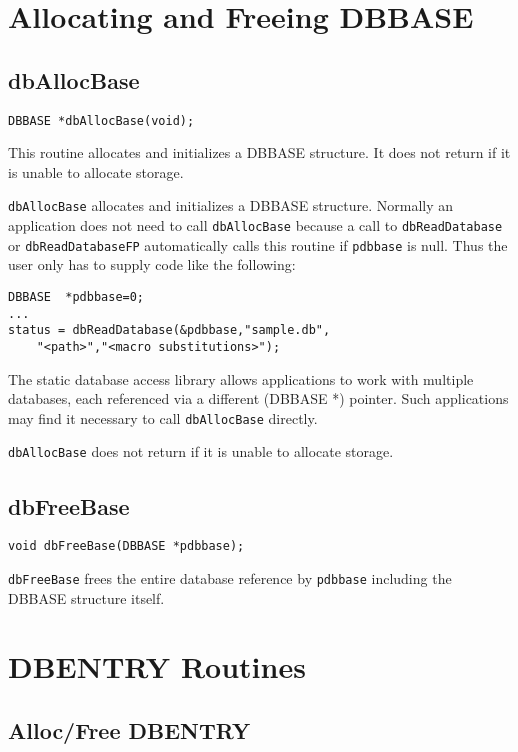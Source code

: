 \section{Allocating and Freeing DBBASE}

\subsection{dbAllocBase}

\begin{verbatim}DBBASE *dbAllocBase(void);
\end{verbatim}This routine allocates and initializes a DBBASE structure. It does not return if it is unable to allocate storage.

\verb|dbAllocBase| allocates and initializes a DBBASE structure. Normally an application does not need to call 
\verb|dbAllocBase| because a call to \verb|dbReadDatabase| or \verb|dbReadDatabaseFP| automatically calls this routine if 
\verb|pdbbase| is null. Thus the user only has to supply code like the following:

\begin{verbatim}DBBASE  *pdbbase=0;
...
status = dbReadDatabase(&pdbbase,"sample.db",
    "<path>","<macro substitutions>");
\end{verbatim}The static database access library allows applications to work with multiple databases, each referenced via a different 
(DBBASE *) pointer. Such applications may find it necessary to call \verb|dbAllocBase| directly.

\verb|dbAllocBase| does not return if it is unable to allocate storage.

\subsection{dbFreeBase}

\begin{verbatim}void dbFreeBase(DBBASE *pdbbase);
\end{verbatim}\verb|dbFreeBase| frees the entire database reference by \verb|pdbbase| including the DBBASE structure itself.

\section{DBENTRY Routines}

\subsection{Alloc/Free DBENTRY}

